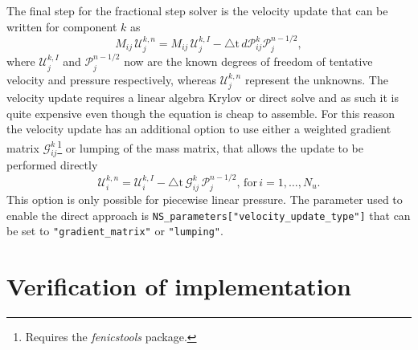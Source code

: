 \documentclass[final,3p,times,twocolumn]{elsarticle}
\newcommand{\inpyth}{\lstinline[style=inlinestyle]} %[]%
\begin{document}
The final step for the fractional step solver is the velocity update that can be written for component $k$ as
\begin{equation}
 M_{ij}\,\mathcal{U}_j^{k,n} =  M_{ij}\,\mathcal{U}_j^{k, I} - \triangle \text{t} \,d\mathcal{P}_{ij}^{k} \mathcal{P}_j^{n-1/2},
 \label{eq:velocity_update}
\end{equation}
where $\mathcal{U}_j^{k, I}$ and $\mathcal{P}_j^{n-1/2}$ now are the known degrees of freedom of tentative velocity and pressure respectively, whereas $\mathcal{U}_j^{k, n}$ represent the unknowns. The velocity update requires a linear algebra Krylov or direct solve and as such it is quite expensive even though the equation is cheap to assemble. For this reason the velocity update has an additional option to use either a weighted gradient matrix $\mathcal{G}_{ij}^k$\footnote{Requires the \emph{fenicstools} \cite{fenicstools} package.} or lumping of the mass matrix, that allows the update to be performed directly
\begin{equation}
\mathcal{U}_i^{k, n} =  \mathcal{U}_i^{k, I} - \triangle \text{t} \, \mathcal{G}_{ij}^k \, \mathcal{P}_j^{n-1/2}, \,\text{for}\, i = 1, \ldots, N_u.
\end{equation}
This option is only possible for piecewise linear pressure. The parameter used to enable the direct approach is \inpyth{NS_parameters["velocity_update_type"]} that can be set to \inpyth{"gradient_matrix"} or \inpyth{"lumping"}.

\section{Verification of implementation}
\label{sec:benchmark}
\end{document}
